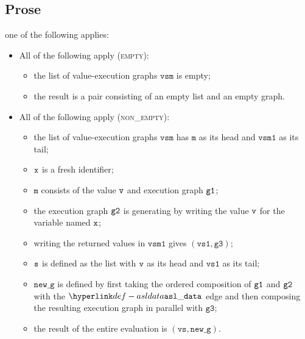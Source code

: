 \documentclass{book}
\newcommand\newg[0]{\texttt{new\_g}}
\newcommand\vm[0]{\texttt{m}}
\newcommand\vvs[0]{\texttt{vs}}
\newcommand\vvsone[0]{\texttt{vs1}}
\newcommand\vgthree[0]{\texttt{g3}}
\newcommand\vvsm[0]{\texttt{vsm}}
\newcommand\vvsmone[0]{\texttt{vsm1}}
\begin{document}
\subsection{Prose}
  one of the following applies:
  \begin{itemize}
  \item All of the following apply (\textsc{empty}):
  \begin{itemize}
    \item the list of value-execution graphs $\vvsm$ is empty;
    \item the result is a pair consisting of an empty list and an empty graph.
  \end{itemize}

  \item All of the following apply (\textsc{non\_empty}):
  \begin{itemize}
    \item the list of value-execution graphs $\vvsm$ has $\vm$ as its head and $\vvsmone$ as its tail;
    \item $\texttt{x}$ is a fresh identifier;
    \item $\vm$ consists of the value $\texttt{v}$ and execution graph $\texttt{g1}$;
    \item the execution graph $\texttt{g2}$ is generating by writing the value $\texttt{v}$ for the variable named $\texttt{x}$;
    \item writing the returned values in $\vvsmone$ gives $(\vvsone, \vgthree)$;
    \item $\texttt{s}$ is defined as the list with $\texttt{v}$ as its head and $\vvsone$ as its tail;
    \item $\newg$ is defined by first taking the ordered composition of $\texttt{g1}$ and $\texttt{g2}$ with the $\asldata$ edge
    and then composing the resulting execution graph in parallel with $\vgthree$;
    \item the result of the entire evaluation is $(\vvs, \newg)$.
  \end{itemize}
\end{itemize}

%
\end{document}
